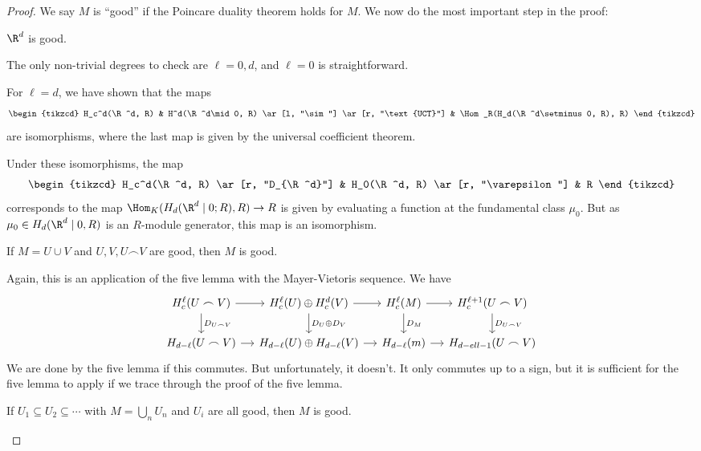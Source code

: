 \documentclass[a4paper]{article}
\begin{document}
\begin{proof}
  We say $M$ is ``good'' if the Poincare duality theorem holds for $M$. We now do the most important step in the proof:
  \begin{claim}[Claim 0]
    $\R^d$ is good.
  \end{claim}
  The only non-trivial degrees to check are $\ell = 0, d$, and $\ell = 0$ is straightforward.

  For $\ell =d $, we have shown that the maps
  \[
    \begin{tikzcd}
      H_c^d(\R^d, R) & H^d(\R^d\mid 0, R) \ar[l, "\sim"] \ar[r, "\text{UCT}"] & \Hom_R(H_d(\R^d\setminus 0, R), R)
    \end{tikzcd}
  \]
  are isomorphisms, where the last map is given by the universal coefficient theorem.

  Under these isomorphisms, the map
  \[
    \begin{tikzcd}
      H_c^d(\R^d, R) \ar[r, "D_{\R^d}"] & H_0(\R^d, R) \ar[r, "\varepsilon"] & R
    \end{tikzcd}
  \]
  corresponds to the map $\Hom_K(H_d(\R^d \mid 0; R), R) \to R$ is given by evaluating a function at the fundamental class $\mu_0$. But as $\mu_0 \in H_d(\R^d \mid 0, R)$ is an $R$-module generator, this map is an isomorphism.

  \begin{claim}[Claim 1]
    If $M = U \cup V$ and $U, V, U \frown V$ are good, then $M$ is good.
  \end{claim}
  Again, this is an application of the five lemma with the Mayer-Vietoris sequence. We have
  \[
    \begin{tikzcd}[column sep=small]
      H_c^\ell (U \frown V) \ar[r] \ar[d, "D_{U \frown V}"] & H_c^\ell(U) \oplus H_c^d(V) \ar[r] \ar[d, "D_U \oplus D_V"] & H_c^\ell(M) \ar[r] \ar[d, "D_M"] & H_c^{\ell + 1}(U \frown V) \ar[d, "D_{U\frown V}"]\\
      H_{d - \ell}(U \frown V) \ar[r] & H_{d - \ell}(U) \oplus H_{d - \ell}(V) \ar[r] & H_{d - \ell}(m) \ar[r] & H_{d - ell - 1}(U \frown V)
    \end{tikzcd}
  \]
  We are done by the five lemma if this commutes. But unfortunately, it doesn't. It only commutes up to a sign, but it is sufficient for the five lemma to apply if we trace through the proof of the five lemma.

  \begin{claim}[Claim 2]
    If $U_1 \subseteq U_2 \subseteq \cdots$ with $M = \bigcup_n U_n$ and $U_i$ are all good, then $M$ is good.
  \end{claim}


\end{proof}
\end{document}
